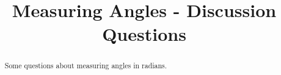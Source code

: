 \documentclass{ximera}
\title{Measuring Angles - Discussion Questions}
\begin{document}
\begin{abstract}
Some questions about measuring angles in radians.
\end{abstract}
\maketitle
\end{document}
